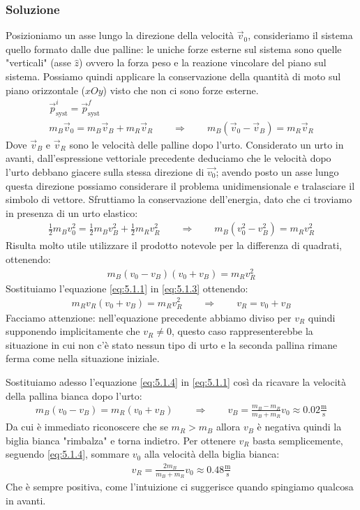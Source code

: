 \documentclass[12pt,a4paper]{book}
\begin{document}
\subsubsection*{Soluzione}
Posizioniamo un asse lungo la direzione della velocità $\vec{v}_0$, consideriamo il sistema quello formato dalle due palline: le uniche forze esterne sul sistema sono quelle "verticali" (asse $\hat{z}$) ovvero la forza peso e la reazione vincolare del piano sul sistema. Possiamo quindi applicare la conservazione della quantità di moto sul piano orizzontale ($xOy$) visto che non ci sono forze esterne. 
%
\begin{gather}
\vec{p}_{\text{syst}}^i=\vec{p}_{\text{syst}}^f \nonumber \\ 
m_B\vec{v}_0=m_B\vec{v}_B+m_R\vec{v}_R \qquad \Longrightarrow \qquad m_B(\vec{v}_0-\vec{v}_B)=m_R\vec{v}_R \label{eq:5.1.1}
\end{gather}
%
Dove $\vec{v}_B$ e $\vec{v}_R$ sono le velocità delle palline dopo l'urto. Considerato un urto in avanti, dall'espressione vettoriale precedente deduciamo che le velocità dopo l'urto debbano giacere sulla stessa direzione di $\vec{v_0}$; avendo posto un asse lungo questa direzione possiamo considerare il problema unidimensionale e tralasciare il simbolo di vettore. Sfruttiamo la conservazione dell'energia, dato che ci troviamo in presenza di un urto elastico:
%
\begin{gather}
\frac{1}{2}m_Bv_0^2=\frac{1}{2}m_Bv_B^2+\frac{1}{2}m_Rv_R^2 \qquad \Longrightarrow \qquad m_B(v_0^2-v_B^2)=m_Rv_R^2 \label{eq:5.1.2}
\end{gather}
%
Risulta molto utile utilizzare il prodotto notevole per la differenza di quadrati, ottenendo:
%
\begin{gather}
m_B(v_0-v_B)(v_0+v_B)=m_Rv_R^2 \label{eq:5.1.3}
\end{gather}
%
Sostituiamo l'equazione \ref{eq:5.1.1} in \ref{eq:5.1.3} ottenendo:
%
\begin{gather}
m_Rv_R(v_0+v_B)=m_Rv_R^2 \qquad \Longrightarrow \qquad v_R=v_0+v_B
\label{eq:5.1.4}
\end{gather}
%
Facciamo attenzione: nell'equazione precedente abbiamo diviso per $v_R$ quindi supponendo implicitamente che $v_R\neq0$, questo caso rappresenterebbe la situazione in cui non c'è stato nessun tipo di urto e la seconda pallina rimane ferma come nella situazione iniziale.

Sostituiamo adesso l'equazione \ref{eq:5.1.4} in \ref{eq:5.1.1} così da ricavare la velocità della pallina bianca dopo l'urto:
%
\begin{gather*}
m_B(v_0-v_B)=m_R(v_0+v_B) \qquad \Longrightarrow \qquad v_B=\frac{m_B-m_R}{m_B+m_R}v_0 \approx 0.02 \frac{\text{m}}{\text{s}}
\end{gather*}
%
Da cui è immediato riconoscere che se $m_R>m_B$ allora $v_B$ è negativa quindi la biglia bianca "rimbalza" e torna indietro.
Per ottenere $v_R$ basta semplicemente, seguendo \ref{eq:5.1.4}, sommare $v_0$ alla velocità della biglia bianca:
%
\begin{gather*}
v_R=\frac{2m_B}{m_B+m_R}v_0 \approx 0.48 \frac{\text{m}}{\text{s}} 
\end{gather*}
%
Che è sempre positiva, come l'intuizione ci suggerisce quando spingiamo qualcosa in avanti.
\end{document}
